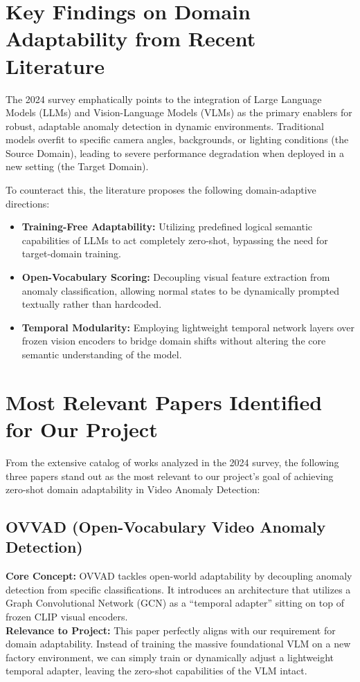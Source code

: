 \documentclass[12pt, a4paper]{article}
\begin{document}
\section{Key Findings on Domain Adaptability from Recent Literature}

The 2024 survey emphatically points to the integration of Large Language Models (LLMs) and Vision-Language Models (VLMs) as the primary enablers for robust, adaptable anomaly detection in dynamic environments. Traditional models overfit to specific camera angles, backgrounds, or lighting conditions (the Source Domain), leading to severe performance degradation when deployed in a new setting (the Target Domain).

To counteract this, the literature proposes the following domain-adaptive directions:

\begin{itemize}
    \item \textbf{Training-Free Adaptability:} Utilizing predefined logical semantic capabilities of LLMs to act completely zero-shot, bypassing the need for target-domain training.
    \item \textbf{Open-Vocabulary Scoring:} Decoupling visual feature extraction from anomaly classification, allowing normal states to be dynamically prompted textually rather than hardcoded.
    \item \textbf{Temporal Modularity:} Employing lightweight temporal network layers over frozen vision encoders to bridge domain shifts without altering the core semantic understanding of the model.
\end{itemize}

\section{Most Relevant Papers Identified for Our Project}

From the extensive catalog of works analyzed in the 2024 survey, the following three papers stand out as the most relevant to our project's goal of achieving zero-shot domain adaptability in Video Anomaly Detection:

\subsection{OVVAD (Open-Vocabulary Video Anomaly Detection)}
\textbf{Core Concept:} OVVAD tackles open-world adaptability by decoupling anomaly detection from specific classifications. It introduces an architecture that utilizes a Graph Convolutional Network (GCN) as a ``temporal adapter'' sitting on top of frozen CLIP visual encoders.\\
\textbf{Relevance to Project:} This paper perfectly aligns with our requirement for domain adaptability. Instead of training the massive foundational VLM on a new factory environment, we can simply train or dynamically adjust a lightweight temporal adapter, leaving the zero-shot capabilities of the VLM intact.
\end{document}
